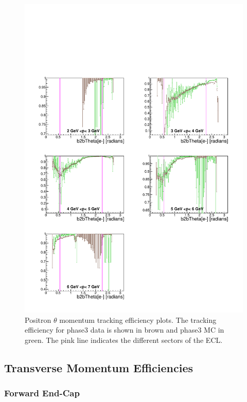 \documentclass[a4paper,11pt,twosided,final,german,openbib,pdftex,listof=totoc,bibliography=totoc]{scrbook}
\begin{document}
\begin{figure}[!htbp]
	\centering
	\includegraphics[width=\textwidth]{Plots/master3/xPMThetaepP3}
	\caption[Momentum $\theta$ Positron Efficiency Phase3]{Positron $\theta$ momentum tracking efficiency plots. The tracking efficiency for phase3 data is shown in brown and phase3 MC in green. The pink line indicates the different sectors of the ECL.}
	\label{plt:xPMThetaep3}
\end{figure}




\newpage
\subsection{Transverse Momentum Efficiencies}



\subsubsection{Forward End-Cap}
\end{document}
